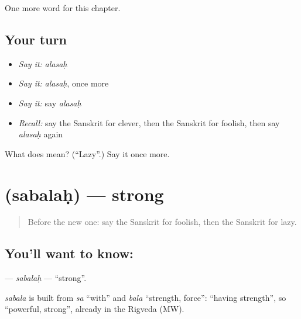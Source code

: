 \begin{grammarlens}[title={What you've built}]
One more word for this chapter.
\end{grammarlens}

\subsection*{Your turn}
\begin{itemize}
\raggedright
  \item \emph{Say it:} \emph{alasaḥ}
  \item \emph{Say it:} \emph{alasaḥ}, once more
  \item \emph{Say it:} say \emph{alasaḥ}
  \item \emph{Recall:} say the Sanskrit for clever, then the Sanskrit for foolish, then say \emph{alasaḥ} again
\end{itemize}

\begin{tcolorbox}[breakable,colback=teal!4,colframe=teal!35!black,title={Before you move on}]
What does  mean? (\textquotedblleft{}Lazy\textquotedblright{}.) Say it once more.
\end{tcolorbox}
\section[\texorpdfstring{\sk{सबलः} (sabalaḥ)}{सबलः (sabalaḥ)}]{ (sabalaḥ) — strong}

\label{lesson:SA-C130-sabalah}



\begin{quote}
Before the new one: say the Sanskrit for foolish, then the Sanskrit for lazy.
\end{quote}

\subsection*{You'll want to know: }
\textbf{} — \emph{sabalaḥ} — \textquotedblleft{}strong\textquotedblright{}.

\begin{cousinweb}
\emph{sabala} is built from \emph{sa} \textquotedblleft{}with\textquotedblright{} and \emph{bala} \textquotedblleft{}strength, force\textquotedblright{}: \textquotedblleft{}having strength\textquotedblright{}, so \textquotedblleft{}powerful, strong\textquotedblright{}, already in the Rigveda (MW).
\end{cousinweb}

